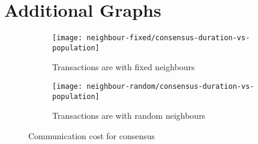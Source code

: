 \chapter{Additional Graphs}
\label{app:additional-graphs}

\begin{figure}[h]
  \centering
  \begin{subfigure}{\textwidth}
    \texttt{[image: neighbour-fixed/consensus-duration-vs-population]}
    \caption{Transactions are with fixed neighbours}
  \end{subfigure}

  \begin{subfigure}{\textwidth}
    \texttt{[image: neighbour-random/consensus-duration-vs-population]}
    \caption{Transactions are with random neighbours}
  \end{subfigure}
  \caption{Communication cost for consensus}
  \label{fig:consensus-duration}
\end{figure}